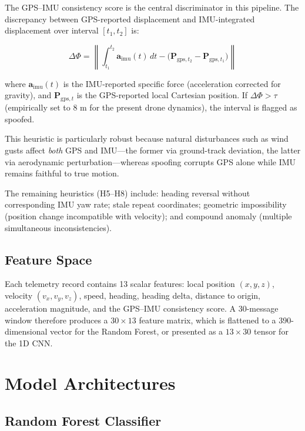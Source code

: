 \documentclass[11pt,a4paper]{article}
\begin{document}
The GPS--IMU consistency score is the central discriminator in this pipeline. The discrepancy between GPS-reported displacement and IMU-integrated displacement over interval $[t_1, t_2]$ is:

\begin{equation}
    \Delta \Phi = \left\| \int_{t_1}^{t_2} \mathbf{a}_{\text{imu}}(t) \, dt - \bigl( \mathbf{P}_{\text{gps}, t_2} - \mathbf{P}_{\text{gps}, t_1} \bigr) \right\|
\end{equation}

where $\mathbf{a}_{\text{imu}}(t)$ is the IMU-reported specific force (acceleration corrected for gravity), and $\mathbf{P}_{\text{gps}, t}$ is the GPS-reported local Cartesian position. If $\Delta \Phi > \tau$ (empirically set to 8 m for the present drone dynamics), the interval is flagged as spoofed.

This heuristic is particularly robust because natural disturbances such as wind gusts affect \textit{both} GPS and IMU---the former via ground-track deviation, the latter via aerodynamic perturbation---whereas spoofing corrupts GPS alone while IMU remains faithful to true motion.

The remaining heuristics (H5--H8) include: heading reversal without corresponding IMU yaw rate; stale repeat coordinates; geometric impossibility (position change incompatible with velocity); and compound anomaly (multiple simultaneous inconsistencies).

\subsection{Feature Space}

Each telemetry record contains 13 scalar features: local position $(x, y, z)$, velocity $(v_x, v_y, v_z)$, speed, heading, heading delta, distance to origin, acceleration magnitude, and the GPS--IMU consistency score. A 30-message window therefore produces a $30 \times 13$ feature matrix, which is flattened to a 390-dimensional vector for the Random Forest, or presented as a $13 \times 30$ tensor for the 1D CNN.

\section{Model Architectures}

\subsection{Random Forest Classifier}
\end{document}
